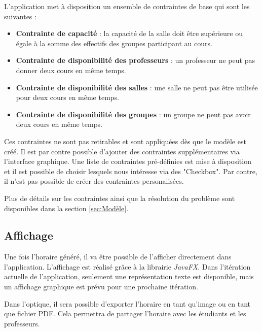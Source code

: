 L'application met à disposition un ensemble de contraintes de base qui sont les suivantes :
\begin{itemize}
    \item \textbf{Contrainte de capacité} : la capacité de la salle doit être supérieure ou égale à la somme des effectifs des groupes participant au cours.
    \item \textbf{Contrainte de disponibilité des professeurs} : un professeur ne peut pas donner deux cours en même temps.
    \item \textbf{Contrainte de disponibilité des salles} : une salle ne peut pas être utilisée pour deux cours en même temps.
    \item \textbf{Contrainte de disponibilité des groupes} : un groupe ne peut pas avoir deux cours en même temps.
\end{itemize}

Ces contraintes ne sont pas retirables et sont appliquées dès que le modèle est créé. Il est par contre possible d'ajouter des contraintes supplémentaires via l'interface graphique. Une liste de contraintes pré-définies est mise à disposition et il est possible de choisir lesquels nous intéresse via des "Checkbox". Par contre, il n'est pas possible de créer des contraintes personalisées.

Plus de détails sur les contraintes ainsi que la résolution du problème sont disponibles dans la section \ref{sec:Modèle}.

\subsection{Affichage}

Une fois l'horaire généré, il va être possible de l'afficher directement dans l'application. L'affichage est réalisé grâce à la librairie \textit{JavaFX}. Dans l'itération actuelle de l'application, seulement une représentation texte est disponible, mais un affichage graphique est prévu pour une prochaine itération.

Dans l'optique, il sera possible d'exporter l'horaire en tant qu'image ou en tant que fichier PDF. Cela permettra de partager l'horaire avec les étudiants et les professeurs.
